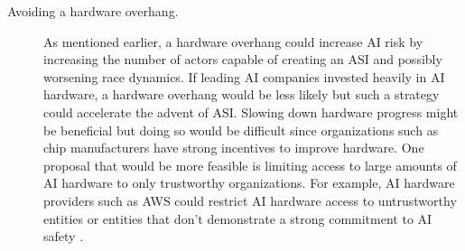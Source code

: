 \documentclass{article}
\begin{document}
\begin{description}
    \item[Avoiding a hardware overhang.] As mentioned earlier, a hardware overhang could increase AI risk by increasing the number of actors capable of creating an ASI and possibly worsening race dynamics. If leading AI companies invested heavily in AI hardware, a hardware overhang would be less likely but such a strategy could accelerate the advent of ASI. Slowing down hardware progress might be beneficial but doing so would be difficult since organizations such as chip manufacturers have strong incentives to improve hardware. One proposal that would be more feasible is limiting access to large amounts of AI hardware to only trustworthy organizations. For example, AI hardware providers such as AWS could restrict AI hardware access to untrustworthy entities or entities that don’t demonstrate a strong commitment to AI safety \cite{parler}.
\end{description}

\printbibliography
\end{document}

